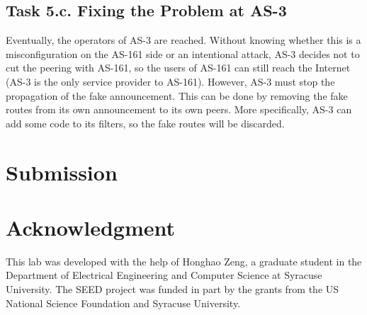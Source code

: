 \subsection{Task 5.c. Fixing the Problem at AS-3} 

Eventually, the operators of AS-3 are reached. Without knowing 
whether this is a misconfiguration on the AS-161 side or an intentional
attack, AS-3 decides not to cut the peering with AS-161, so the users 
of AS-161 can still reach the Internet (AS-3 is the only service 
provider to AS-161). However, AS-3 must stop the propagation of the 
fake announcement. This can be done by removing the 
fake routes from its own announcement to its own peers.
More specifically, AS-3 can add some code to its 
filters, so the fake routes will be discarded. 


\section{Submission}





\section*{Acknowledgment} 

This lab was developed with the help of Honghao Zeng, 
a graduate student in the Department of Electrical Engineering 
and Computer Science at Syracuse University. 
The SEED project was funded in part 
by the grants from the US National Science Foundation
and Syracuse University.







